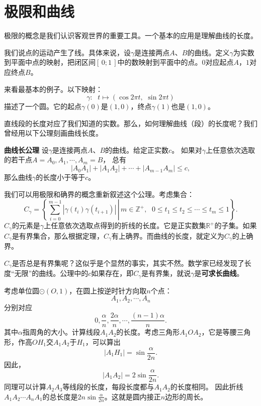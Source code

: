 \documentclass[12pt,UTF8]{ctexbook}
\begin{document}
\section{极限和曲线}

极限的概念是我们认识客观世界的重要工具。一个基本的应用是理解曲线的长度。

我们说点的运动产生了线。具体来说，设$\gamma$是连接两点$A$、$B$的曲线。定义$\gamma$为实数到平面中点的映射，把闭区间$[\,0;1\,]$中的数映射到平面中的点。$0$对应起点$A$，$1$对应终点$B$。

来看最基本的例子。以下映射：
$$ \gamma : \;\,\, t \mapsto (\cos{2\pi t}, \,\, \sin{2\pi t})$$
描述了一个圆。它的起点$\gamma(0)$是$(1,0)$，终点$\gamma(1)$也是$(1,0)$。

直线段的长度对应了我们知道的实数。那么，如何理解曲线（段）的长度呢？我们曾经用以下公理刻画曲线长度。
\begin{po}{\textbf{曲线长公理}}
    设$\gamma$是连接两点$A$、$B$的曲线。给定正实数$c$。
    如果对$\gamma$上任意依次选取的若干点$A = A_0, A_1, \cdots , A_m = B$，
    总有
    $$ |A_0A_1| + |A_1A_2| + \cdots + |A_{m-1}A_m| \leqslant c,$$
    那么曲线$\gamma$的长度小于等于$c$。
\end{po}

我们可以用极限和确界的概念重新叙述这个公理。考虑集合：
$$ C_\gamma = \left\{\left. \sum_{i=0}^{m-1} |\gamma(t_i)\gamma(t_{i+1})|\, \right| \, m\in\mathbb{Z}^+,\;\,\, 0\leqslant t_1 \leqslant t_2 \leqslant \cdots \leqslant t_m\leqslant 1 \right\}.$$
$C_\gamma$的元素是$\gamma$上任意依次选取点得到的折线的长度。它是正实数集$\mathbb{R}^+$的子集。如果$C_\gamma$是有界集合，那么根据定理\label{tm:2-2-10}，$C_\gamma$有上确界。而曲线的长度，就定义为$C_\gamma$的上确界。

$C_\gamma$是否总是有界集呢？这似乎是个显然的事实，其实不然。数学家已经发现了长度“无限”的曲线。公理中的$c$如果存在，即$C_\gamma$是有界集，就说$\gamma$是\textbf{可求长曲线}。

\begin{ex}
    考虑单位圆$\odot(O, 1)$，在圆上按逆时针方向取$n$个点：
    $$ A_1, A_2, \cdots , A_n $$
    分别对应
    $$0,\frac{\alpha}{n}, \frac{2\alpha}{n}, \cdots , \frac{(n-1)\alpha}{n}.$$
    其中$\alpha$指周角的大小。计算线段$A_1A_2$的长度。考虑三角形$A_1OA_2$，它是等腰三角形，作高$OH_1$交$A_1A_2$于$H_1$，可以算出
    $$ |A_1H_1| = \sin{\frac{\alpha}{2n}}.$$
    因此，
    $$ |A_1A_2| = 2\sin{\frac{\alpha}{2n}}.$$
    同理可以计算$A_2A_3$等线段的长度，每段长度都与$A_1A_2$的长度相同。
    因此折线$A_1A_2\cdots A_nA_1$的总长度是$2n\sin{\frac{\alpha}{2n}}$。这就是圆内接正$n$边形的周长。
\end{ex}
\end{document}

